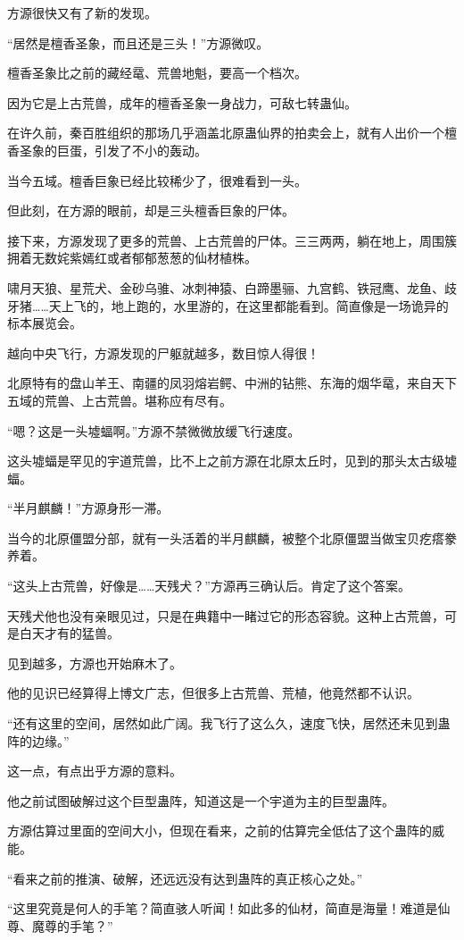 \begin{this_body}
方源很快又有了新的发现。

“居然是檀香圣象，而且还是三头！”方源微叹。

檀香圣象比之前的藏经鼋、荒兽地魁，要高一个档次。

因为它是上古荒兽，成年的檀香圣象一身战力，可敌七转蛊仙。

在许久前，秦百胜组织的那场几乎涵盖北原蛊仙界的拍卖会上，就有人出价一个檀香圣象的巨蛋，引发了不小的轰动。

当今五域。檀香巨象已经比较稀少了，很难看到一头。

但此刻，在方源的眼前，却是三头檀香巨象的尸体。

接下来，方源发现了更多的荒兽、上古荒兽的尸体。三三两两，躺在地上，周围簇拥着无数姹紫嫣红或者郁郁葱葱的仙材植株。

啸月天狼、星荒犬、金砂乌骓、冰刺神猿、白蹄墨骊、九宫鹤、铁冠鹰、龙鱼、歧牙猪……天上飞的，地上跑的，水里游的，在这里都能看到。简直像是一场诡异的标本展览会。

越向中央飞行，方源发现的尸躯就越多，数目惊人得很！

北原特有的盘山羊王、南疆的凤羽熔岩鳄、中洲的钻熊、东海的烟华鼋，来自天下五域的荒兽、上古荒兽。堪称应有尽有。

“嗯？这是一头墟蝠啊。”方源不禁微微放缓飞行速度。

这头墟蝠是罕见的宇道荒兽，比不上之前方源在北原太丘时，见到的那头太古级墟蝠。

“半月麒麟！”方源身形一滞。

当今的北原僵盟分部，就有一头活着的半月麒麟，被整个北原僵盟当做宝贝疙瘩豢养着。

“这头上古荒兽，好像是……天残犬？”方源再三确认后。肯定了这个答案。

天残犬他也没有亲眼见过，只是在典籍中一睹过它的形态容貌。这种上古荒兽，可是白天才有的猛兽。

见到越多，方源也开始麻木了。

他的见识已经算得上博文广志，但很多上古荒兽、荒植，他竟然都不认识。

“还有这里的空间，居然如此广阔。我飞行了这么久，速度飞快，居然还未见到蛊阵的边缘。”

这一点，有点出乎方源的意料。

他之前试图破解过这个巨型蛊阵，知道这是一个宇道为主的巨型蛊阵。

方源估算过里面的空间大小，但现在看来，之前的估算完全低估了这个蛊阵的威能。

“看来之前的推演、破解，还远远没有达到蛊阵的真正核心之处。”

“这里究竟是何人的手笔？简直骇人听闻！如此多的仙材，简直是海量！难道是仙尊、魔尊的手笔？”


\end{this_body}
